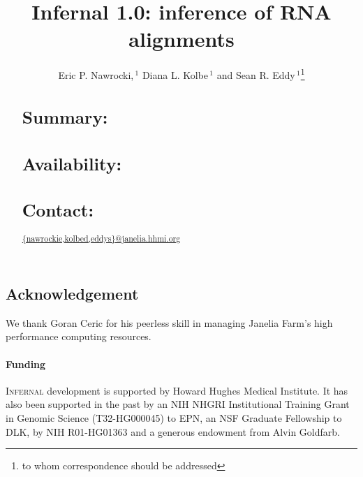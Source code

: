 \documentclass{bioinfo}
\begin{document}

\begin{application}

\title[Infernal 1.0]{Infernal 1.0: inference of RNA alignments}
\author[E. Nawrocki, D. Kolbe and S. Eddy]{Eric P. Nawrocki,\,$^1$ Diana L. Kolbe\,$^1$ and Sean R. Eddy\,$^1$\footnote{to whom correspondence should be addressed}}
\address{$^{1}$HHMI Janelia Farm Research Campus, Ashburn VA 20147, USA\\}



\maketitle

\begin{abstract}
\section{Summary:}

\section{Availability:}

\section{Contact:} \url{{nawrockie,kolbed,eddys}@janelia.hhmi.org}
\end{abstract}






\section*{Acknowledgement}

We thank Goran Ceric for his peerless skill in managing Janelia Farm's
high performance computing resources.

\paragraph*{Funding\textcolon} 
\textsc{Infernal} development is supported by Howard Hughes Medical
Institute. It has also been supported in the past by an NIH NHGRI
Institutional Training Grant in Genomic Science (T32-HG000045) to EPN,
an NSF Graduate Fellowship to DLK, by NIH R01-HG01363 and a
generous endowment from Alvin Goldfarb. 



\end{application}
\end{document}

